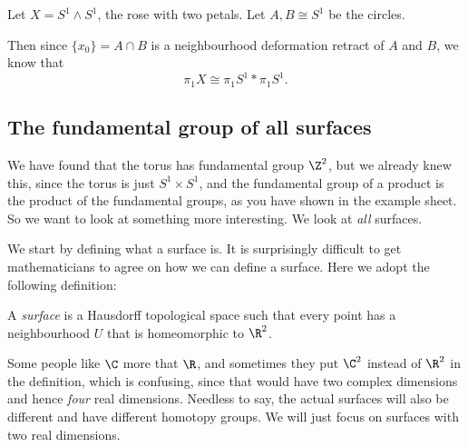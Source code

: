 \documentclass[a4paper]{article}
\begin{document}
\begin{eg}
  Let $X = S^1 \wedge S^1$, the rose with two petals. Let $A, B\cong S^1$ be the circles.
  \begin{center}
  \end{center}
  Then since $\{x_0\} = A \cap B$ is a neighbourhood deformation retract of $A$ and $B$, we know that
  \[
    \pi_1 X \cong \pi_1 S^1 * \pi_1S^1.
  \]
\end{eg}
\subsection{The fundamental group of all surfaces}
We have found that the torus has fundamental group $\Z^2$, but we already knew this, since the torus is just $S^1 \times S^1$, and the fundamental group of a product is the product of the fundamental groups, as you have shown in the example sheet. So we want to look at something more interesting. We look at \emph{all} surfaces.

We start by defining what a surface is. It is surprisingly difficult to get mathematicians to agree on how we can define a surface. Here we adopt the following definition:
\begin{defi}[Surface]
  A \emph{surface} is a Hausdorff topological space such that every point has a neighbourhood $U$ that is homeomorphic to $\R^2$.
\end{defi}
Some people like $\C$ more that $\R$, and sometimes they put $\C^2$ instead of $\R^2$ in the definition, which is confusing, since that would have two complex dimensions and hence \emph{four} real dimensions. Needless to say, the actual surfaces will also be different and have different homotopy groups. We will just focus on surfaces with two real dimensions.
\end{document}
